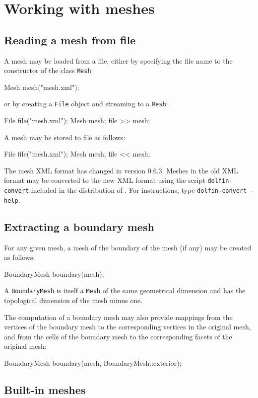 \section{Working with meshes}

\subsection{Reading a mesh from file}

A mesh may be loaded from a file, either by specifying the file name
to the constructor of the class \texttt{Mesh}:
\begin{code}
Mesh mesh("mesh.xml");
\end{code}
or by creating a \texttt{File} object and streaming to a
\texttt{Mesh}:
\begin{code}
File file("mesh.xml");
Mesh mesh;
file >> mesh;
\end{code}
A mesh may be stored to file as follows:
\begin{code}
File file("mesh.xml");
Mesh mesh;
file << mesh;
\end{code}

The \dolfin{} mesh XML format has changed in \dolfin{} version
0.6.3. Meshes in the old XML format may be converted to the new XML
format using the script \texttt{dolfin-convert} included in the
distribution of \dolfin{}. For instructions, type
\texttt{dolfin-convert --help}.

\subsection{Extracting a boundary mesh}

For any given mesh, a mesh of the boundary of the mesh (if any) may be
created as follows:
\begin{code}
BoundaryMesh boundary(mesh);
\end{code}
A \texttt{BoundaryMesh} is itself a \texttt{Mesh} of the same
geometrical dimension and has the topological dimension of the mesh
minus one.

The computation of a boundary mesh may also provide mappings from the
vertices of the boundary mesh to the corresponding vertices in the
original mesh, and from the cells of the boundary mesh to the
corresponding facets of the original mesh:
\begin{code}
BoundaryMesh boundary(mesh, BoundaryMesh::exterior);
\end{code}

\subsection{Built-in meshes}


